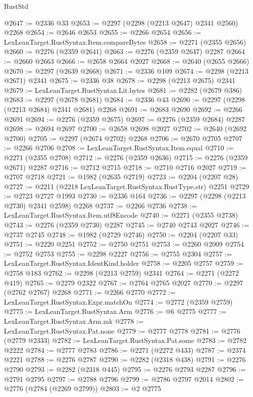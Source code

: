 \begin{lexlean}{RustStd}
\begin{coremodule}
@2647 := @2336 @33
@2653 := @2297 (@2298 (@2213 @2647) @2341 @2560) @2268
@2654 := @2646 @2653
@2655 := @2266 @2654
@2656 := LexLeanTarget.RustSyntax.Item.compareBytes
@2658 := @2271 (@2355 @2656)
@2660 := @2276 (@2359 @2641)
@2663 := @2276 (@2359 @2647) @2287
@2664 := @2660 @2663
@2666 := @2658 @2664 @2027
@2668 := @2640 (@2655 @2666)
@2670 := @2297 (@2639 @2668)
@2671 := @2336 @109
@2674 := @2298 (@2213 @2671) @2341
@2675 := @2336 @38
@2678 := @2298 (@2213 @2675) @2341
@2679 := LexLeanTarget.RustSyntax.Lit.bytes
@2681 := @2282 (@2679 @386)
@2683 := @2297 (@2678 @2681)
@2684 := @2336 @43
@2690 := @2297 (@2298 (@2213 @2684) @2341 @2681) @2268
@2691 := @2683 @2690
@2692 := @2266 @2691
@2694 := @2276 (@2359 @2675)
@2697 := @2276 (@2359 @2684) @2287
@2698 := @2694 @2697
@2700 := @2658 @2698 @2027
@2702 := @2640 (@2692 @2700)
@2705 := @2297 (@2674 @2702) @2268
@2706 := @2670 @2705
@2707 := @2266 @2706
@2708 := LexLeanTarget.RustSyntax.Item.equal
@2710 := @2271 (@2355 @2708)
@2712 := @2276 (@2359 @2636)
@2715 := @2276 (@2359 @2671) @2287
@2716 := @2712 @2715
@2718 := @2710 @2716 @2027
@2719 := @2707 @2718
@2721 := @1982 (@2635 @2719)
@2723 := @2204 (@2207 @28)
@2727 := @2211 (@2218 LexLeanTarget.RustSyntax.RustType.str) @2251
@2729 := @2723 @2727 @1993
@2730 := @2336 @164
@2736 := @2297 (@2298 (@2213 @2730) @2341 @2598) @2268
@2737 := @2266 @2736
@2738 := LexLeanTarget.RustSyntax.Item.utf8Encode
@2740 := @2271 (@2355 @2738)
@2743 := @2276 (@2359 @2730) @2287
@2745 := @2740 @2743 @2027
@2746 := @2737 @2745
@2748 := @1982 (@2729 @2746)
@2750 := @2204 (@2207 @33)
@2751 := @2220 @2251
@2752 := @2750 @2751
@2753 := @2260 @2009
@2754 := @2752 @2753
@2755 := @2298 @2227
@2756 := @2755 @2304
@2757 := LexLeanTarget.RustSyntax.IdentKind.holder
@2758 := @2205 @2757
@2759 := @2758 @183
@2762 := @2298 (@2213 @2759) @2341
@2764 := @2271 (@2272 @419)
@2765 := @2279 @2322
@2767 := @2764 @2765 @2027
@2770 := @2297 (@2762 @2767) @2268
@2771 := @2266 @2770
@2772 := LexLeanTarget.RustSyntax.Expr.matchOn
@2774 := @2772 (@2359 @2759)
@2775 := LexLeanTarget.RustSyntax.Arm
@2776 := @6 @2775
@2777 := LexLeanTarget.RustSyntax.Arm.mk
@2778 := LexLeanTarget.RustSyntax.Pat.none
@2779 := @2777 @2778
@2781 := @2776 (@2779 @2333)
@2782 := LexLeanTarget.RustSyntax.Pat.some
@2783 := @2782 @2222
@2784 := @2777 @2783
@2786 := @2271 (@2272 @433)
@2787 := @2374 @2221
@2788 := @2276 @2787
@2790 := @2282 (@2318 @438)
@2791 := @2276 @2790
@2793 := @2282 (@2318 @445)
@2795 := @2276 @2793 @2287
@2796 := @2791 @2795
@2797 := @2788 @2796
@2799 := @2786 @2797 @2014
@2802 := @2776 (@2784 (@2269 @2799))
@2803 := @2 @2775

\end{coremodule}
\end{lexlean}
